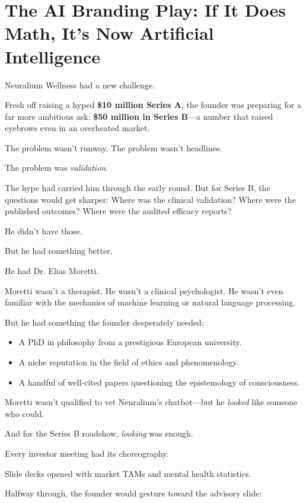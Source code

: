 \section{The AI\texttrademark{} Branding Play: If It Does Math, It’s Now Artificial Intelligence}

Neuralium Wellness had a new challenge.

Fresh off raising a hyped \textbf{\$10 million Series A}, the founder was preparing for a far more ambitious ask:  
\textbf{\$50 million in Series B}—a number that raised eyebrows even in an overheated market.

The problem wasn’t runway. The problem wasn’t headlines.

The problem was \textit{validation}.

The hype had carried him through the early round. But for Series B, the questions would get sharper:  
Where was the clinical validation?  
Where were the published outcomes?  
Where were the audited efficacy reports?

He didn’t have those.

But he had something better.

He had Dr. Elias Moretti.

Moretti wasn’t a therapist. He wasn’t a clinical psychologist. He wasn’t even familiar with the mechanics of machine learning or natural language processing.

But he had something the founder desperately needed:

\begin{itemize}
  \item A PhD in philosophy from a prestigious European university.
  \item A niche reputation in the field of ethics and phenomenology.
  \item A handful of well-cited papers questioning the epistemology of consciousness.
\end{itemize}

Moretti wasn’t qualified to vet Neuralium’s chatbot—but he \textit{looked} like someone who could.

And for the Series B roadshow, \textit{looking} was enough.

\medskip

Every investor meeting had its choreography.

Slide decks opened with market TAMs and mental health statistics.

Halfway through, the founder would gesture toward the advisory slide:

